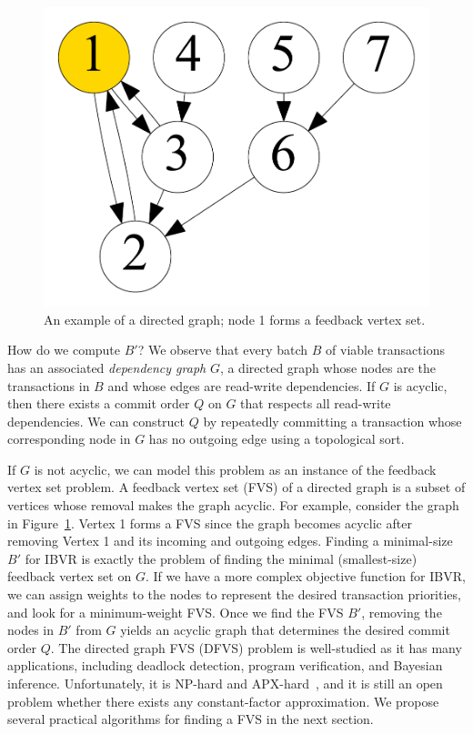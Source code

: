 \begin{figure}[t]
	\centering
	\includegraphics[width=0.3\columnwidth]{./alg_fig/fvs-eg}
	\caption{An example of a directed graph; node 1 forms a feedback vertex set.}
	\label{fig:fvs}
\end{figure}

How do we compute $B'$? We observe that every batch $B$ of viable transactions 
has an associated \emph{dependency graph} $G$, a directed graph whose nodes are the transactions in $B$ and whose edges are read-write dependencies.
If $G$ is acyclic, then there exists a commit order $Q$ on $G$ that respects all read-write dependencies. We can construct $Q$ by repeatedly committing a transaction whose corresponding node in $G$ has no outgoing edge using a topological sort. 

If $G$ is not acyclic, we can model this problem as an instance of the feedback vertex set problem. 
A feedback vertex set (FVS) of a directed graph is a subset of vertices whose removal makes the graph acyclic. For example, consider the graph in Figure~\ref{fig:fvs}. Vertex 1 forms a FVS since the graph becomes acyclic after removing Vertex 1 and its incoming and outgoing edges. Finding a minimal-size $B'$ for IBVR is exactly the problem of finding the minimal (smallest-size) feedback vertex set on $G$. If we have a more complex objective function for IBVR, we can assign weights to the nodes to represent the desired transaction priorities, and look for a minimum-weight FVS. 
Once we find the FVS $B'$, removing the nodes in $B'$ from $G$ yields an acyclic graph that determines the desired commit order $Q$.
The directed graph FVS (DFVS) problem is well-studied as it has many applications, including deadlock detection, program verification, and Bayesian inference. Unfortunately, it is NP-hard and APX-hard~\cite{kann1992approximability, karp1972reducibility}, and it is still an open problem whether there exists any constant-factor approximation.
We propose several practical algorithms for finding a FVS in the next section.


